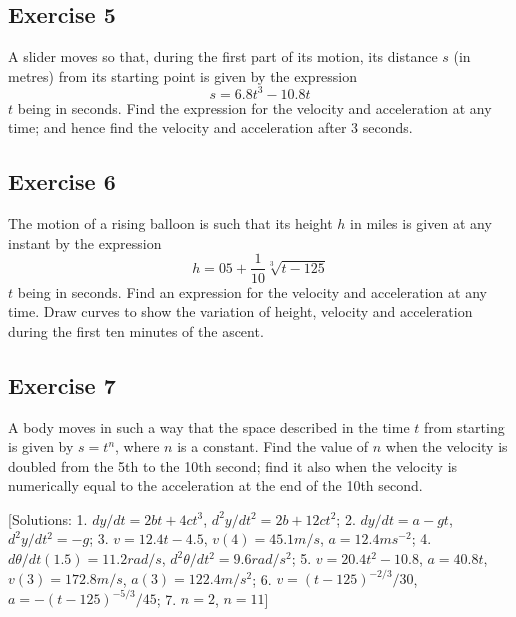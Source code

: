 \documentclass[
  11pt,
  oneside]{book}
\newcommand{\slide}{}
\theoremstyle{definition}
\theoremstyle{definition}
\theoremstyle{definition}
\theoremstyle{definition}
\theoremstyle{remark}
\begin{document}
\slide

\subsection*{Exercise 5}\label{exercise-5-1}

A slider moves so that, during the first part of its motion, its distance \(s\) (in metres) from its starting point is given by the expression
\[
s = 6.8t^3 - 10.8t
\]
\(t\) being in seconds. Find the expression for the velocity and acceleration at any time; and hence find the velocity and acceleration after \(3\) seconds.

\slide

\subsection*{Exercise 6}\label{exercise-6-1}

The motion of a rising balloon is such that its height \(h\) in miles is given at any instant by the expression
\[
h = 05+ \frac1{10}\sqrt[3]{t-125}
\]
\(t\) being in seconds. Find an expression for the velocity and acceleration at any time. Draw curves to show the variation of height, velocity and acceleration during the first ten minutes of the ascent.

\slide

\subsection*{Exercise 7}\label{exercise-7}

A body moves in such a way that the space described in the time \(t\) from starting is given by \(s = t^n\), where \(n\) is a constant. Find the value of \(n\) when the velocity is doubled from the 5th to the 10th second; find it also when the velocity is numerically equal to the acceleration at the end of the 10th second.

{[}Solutions: 1. \(dy/dt=2bt+4ct^3\), \(d^2y/dt^2=2b+12ct^2\); 2. \(dy/dt=a-gt\), \(d^2y/dt^2=-g\); 3. \(v=12.4t-4.5\), \(v(4)=45.1m/s\), \(a=12.4ms^{-2}\); 4. \(d\theta/dt(1.5)=11.2rad/s\), \(d^2\theta/dt^2 = 9.6rad/s^2\); 5. \(v=20.4t^2-10.8\), \(a=40.8t\), \(v(3)=172.8m/s\), \(a(3)=122.4m/s^2\); 6. \(v=(t-125)^{-2/3}/30\), \(a=-(t-125)^{-5/3}/45\); 7. \(n=2\), \(n=11\){]}

\slide
\end{document}
